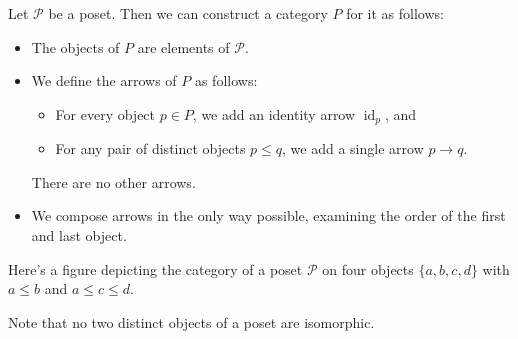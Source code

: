 \begin{example}
   Let $\mathcal{P} $ be a poset. Then we can construct a category $P$ for it as follows:
   \begin{itemize}
       \item The objects of $P$ are elements of $\mathcal{P} $.
    \item We define the arrows of $P$ as follows:
        \begin{itemize}
            \item For every object $p\in P$, we add an identity arrow $\operatorname{id}_p$, and 
            \item For any pair of distinct objects $p\leq q$, we add a single arrow $p\to q$. 
        \end{itemize}
        There are no other arrows.
    \item We compose arrows in the only way possible, examining the order of the first and last object.
   \end{itemize}
   Here's a figure depicting the category of a poset $\mathcal{P} $ on four objects $\{a,b,c,d\} $ with $a\leq b$ and $a\leq c\leq d$.
            \begin{figure}[H]
                \centering
            \end{figure}
            Note that no two distinct objects of a poset are isomorphic.
\end{example}

